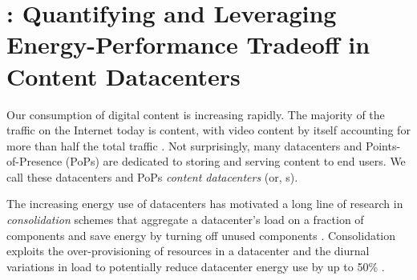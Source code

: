 \chapter{\shrink: Quantifying and Leveraging Energy-Performance Tradeoff in Content Datacenters}
\label{ch:shrink}

Our consumption of digital content is increasing rapidly. The majority of the traffic on the Internet today is content, with video content by itself accounting for more than half the total traffic \cite{cisco-videogrowth, nielsen-video-growth}.  Not surprisingly, many datacenters  and  Points-of-Presence (PoPs) are dedicated to storing and serving content to end users. We call these datacenters and PoPs  {\em content datacenters} (or, \cdc s).

The increasing energy use of datacenters \cite{GreenbergCost, rasmussen2011determining, power-cost} has motivated a long line of research in \emph{consolidation} schemes that aggregate a datacenter's load on a fraction of components and save energy by turning off unused components \cite{chase2001managing, mathew12, rajamani2003evaluating, lin12}. 
Consolidation exploits the over-provisioning of resources in a datacenter and the diurnal variations in load to potentially reduce datacenter energy use by up to 50\% \cite{mathew12}.





%

